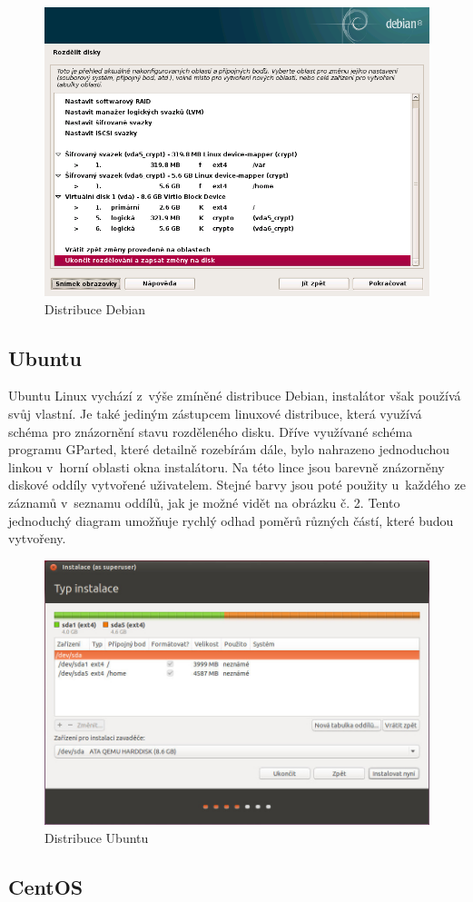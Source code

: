 \documentclass[color,table,oneside,nolot,nolof]{fithesis}
\begin{document}
\begin{figure}[hb]
	\caption{Distribuce Debian}
	\centering
	\includegraphics[width=.6\columnwidth]{pictures/debian1.png}
\end{figure}

\subsection{Ubuntu}

Ubuntu Linux vychází z~výše zmíněné distribuce Debian, instalátor však používá svůj vlastní. Je také jediným zástupcem linuxové distribuce, která využívá  schéma 
pro znázornění stavu rozděleného disku. Dříve využívané schéma programu GParted, které detailně rozebírám dále, bylo nahrazeno jednoduchou linkou v~horní oblasti okna instalátoru. Na této lince 
jsou barevně znázorněny diskové 
oddíly vytvořené uživatelem. Stejné barvy jsou poté použity u~každého ze záznamů v~seznamu oddílů, jak je možné vidět na obrázku č. 2. Tento jednoduchý diagram umožňuje rychlý odhad poměrů různých 
částí, které budou vytvořeny.

\begin{figure}[hb]
	\label{fig:ubuntu}
	\caption{Distribuce Ubuntu}
	\centering
	\includegraphics[width=.6\columnwidth]{pictures/ubuntu1.jpg}
\end{figure}

\subsection{CentOS}
\end{document}
